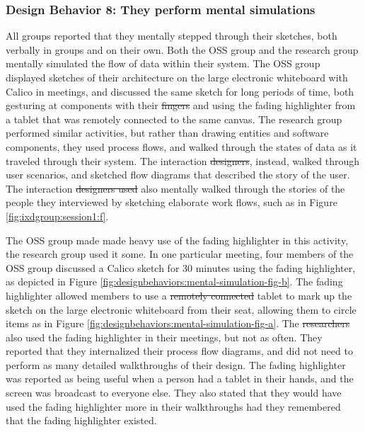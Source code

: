 \documentclass[12pt,fleqn]{ucithesis}
\providecommand{\DIFaddtex}[1]{{\protect\color{blue}\uwave{#1}}} %
\providecommand{\DIFdeltex}[1]{{\protect\color{red}\sout{#1}}}                      %
\providecommand{\DIFaddbegin}{} %
\providecommand{\DIFaddend}{} %
\providecommand{\DIFdelbegin}{} %
\providecommand{\DIFdelend}{} %
\providecommand{\DIFadd}[1]{\texorpdfstring{\DIFaddtex{#1}}{#1}} %
\providecommand{\DIFdel}[1]{\texorpdfstring{\DIFdeltex{#1}}{}} %
\begin{document}

\subsubsection{Design Behavior 8: They perform mental simulations}

All groups reported that they mentally stepped through their sketches, both verbally in groups and on their own. Both the OSS group and the research group mentally simulated the flow of data within their system. The OSS group displayed sketches of their architecture on the large electronic whiteboard with Calico in meetings, and discussed the same sketch for long periods of time, both gesturing at components with their \DIFdelbegin \DIFdel{fingers }\DIFdelend \DIFaddbegin \DIFadd{hands }\DIFaddend and using the fading highlighter from a tablet that was remotely connected to the same canvas. The research group performed similar activities, but rather than drawing entities and software components, they used process flows, and walked through the states of data as it traveled through their system. The interaction \DIFdelbegin \DIFdel{designers}\DIFdelend \DIFaddbegin \DIFadd{design group}\DIFaddend , instead, walked through user scenarios, and sketched flow diagrams that described the story of the user. The interaction \DIFdelbegin \DIFdel{designers used }\DIFdelend \DIFaddbegin \DIFadd{design group }\DIFaddend also mentally walked through the stories of the people they interviewed by sketching elaborate work flows, such as in Figure \ref{fig:ixdgroup:session1:f}.

The OSS group made made heavy use of the fading highlighter in this activity, the research group used it some. In one particular meeting, four members of the OSS group discussed a Calico sketch for 30 minutes using the fading highlighter, as depicted in Figure \ref{fig:designbehaviors:mental-simulation-fig-b}. The fading highlighter allowed members to use a \DIFdelbegin \DIFdel{remotely connected }\DIFdelend tablet to mark up the sketch on the large electronic whiteboard from their seat, allowing them to circle items as in Figure \ref{fig:designbehaviors:mental-simulation-fig-a}.  The \DIFdelbegin \DIFdel{researchers }\DIFdelend \DIFaddbegin \DIFadd{research group }\DIFaddend also used the fading highlighter in their meetings, but not as often. They reported that they internalized their process flow diagrams, and did not need to perform as many detailed walkthroughs of their design. The fading highlighter was reported as being useful when a person had a tablet in their hands, and the screen was broadcast to everyone else. They also stated that they would have used the fading highlighter more in their walkthroughs had they remembered that the fading highlighter existed.
\end{document}
